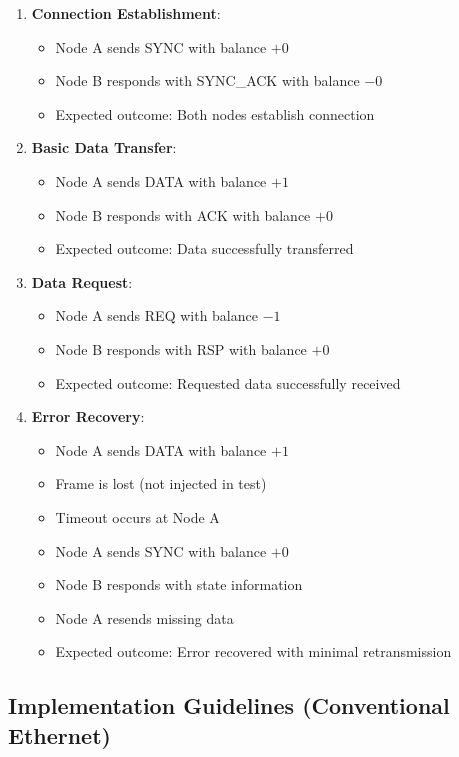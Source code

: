 \documentclass[../../../OAE-SPEC-MAIN.tex]{subfiles}
\begin{document}
\begin{enumerate}
    \item \textbf{Connection Establishment}:
    \begin{itemize}
        \item Node A sends SYNC with balance $+0$
        \item Node B responds with SYNC\_ACK with balance $-0$
        \item Expected outcome: Both nodes establish connection
    \end{itemize}
    
    \item \textbf{Basic Data Transfer}:
    \begin{itemize}
        \item Node A sends DATA with balance $+1$
        \item Node B responds with ACK with balance $+0$
        \item Expected outcome: Data successfully transferred
    \end{itemize}
    
    \item \textbf{Data Request}:
    \begin{itemize}
        \item Node A sends REQ with balance $-1$
        \item Node B responds with RSP with balance $+0$
        \item Expected outcome: Requested data successfully received
    \end{itemize}
    
    \item \textbf{Error Recovery}:
    \begin{itemize}
        \item Node A sends DATA with balance $+1$
        \item Frame is lost (not injected in test)
        \item Timeout occurs at Node A
        \item Node A sends SYNC with balance $+0$
        \item Node B responds with state information
        \item Node A resends missing data
        \item Expected outcome: Error recovered with minimal retransmission
    \end{itemize}
\end{enumerate}

\subsection{Implementation Guidelines (Conventional Ethernet)}
\end{document}
